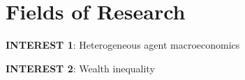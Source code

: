 \vspace{0.2in}
\section{Fields of Research} %
\label{sec:research_backg}
\vspace{-0.25in}
\begin{outerlist}
	\item {\bf INTEREST 1}: Heterogeneous agent macroeconomics \item {\bf INTEREST 2}: Wealth inequality

\end{outerlist}

